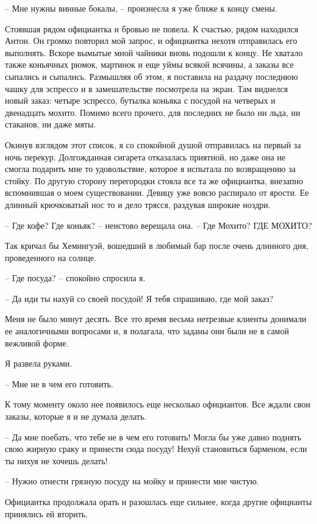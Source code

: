 \documentclass[
]{book}
\begin{document}
-- Мне нужны винные бокалы, -- произнесла я уже ближе к концу смены.

Стоявшая рядом официантка и бровью не повела. К счастью, рядом находился Антон. Он громко повторил мой запрос, и официантка нехотя отправилась его выполнять. Вскоре вымытые мной чайники вновь подошли к концу. Не хватало также коньячных рюмок, мартинок и еще уймы всякой всячины, а заказы все сыпались и сыпались. Размышляя об этом, я поставила на раздачу последнюю чашку для эспрессо и в замешательстве посмотрела на экран. Там виднелся новый заказ: четыре эспрессо, бутылка коньяка с посудой на четверых и двенадцать мохито. Помимо всего прочего, для последних не было ни льда, ни стаканов, ни даже мяты.

Окинув взглядом этот список, я со спокойной душой отправилась на первый за ночь перекур. Долгожданная сигарета отказалась приятной, но даже она не смогла подарить мне то удовольствие, которое я испытала по возвращению за стойку. По другую сторону перегородки стояла все та же официантка, внезапно вспомнившая о моем существовании. Девицу уже вовсю распирало от ярости. Ее длинный крючковатый нос то и дело трясся, раздувая широкие ноздри.

-- Где кофе? Где коньяк? -- неистово верещала она. -- Где Мохито? ГДЕ МОХИТО?

Так кричал бы Хемингуэй, вошедший в любимый бар после очень длинного дня, проведенного на солнце.

-- Где посуда? -- спокойно спросила я.

-- Да иди ты нахуй со своей посудой! Я тебя спрашиваю, где мой заказ?

Меня не было минут десять. Все это время весьма нетрезвые клиенты донимали ее аналогичными вопросами и, я полагала, что заданы они были не в самой вежливой форме.

Я развела руками.

-- Мне не в чем его готовить.

К тому моменту около нее появилось еще несколько официантов. Все ждали свои заказы, которые я и не думала делать.

-- Да мне поебать, что тебе не в чем его готовить! Могла бы уже давно поднять свою жирную сраку и принести сюда посуду! Нехуй становиться барменом, если ты нихуя не хочешь делать!

-- Нужно отнести грязную посуду на мойку и принести мне чистую.

Официантка продолжала орать и разошлась еще сильнее, когда другие официанты принялись ей вторить.
\end{document}
